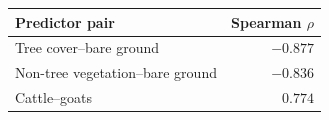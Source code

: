 \begin{tabular}{lr}
\toprule
Predictor pair & Spearman $\rho$\\
\midrule
Tree cover--bare ground & $-0.877$\\
Non-tree vegetation--bare ground & $-0.836$\\
Cattle--goats & $0.774$\\
\bottomrule
\end{tabular}
\\[0.5em]
\noindent{}
